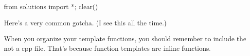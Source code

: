 \begin{python0}
from solutions import *; clear()
\end{python0}

Here's a very common gotcha. (I see this all the time.)

When you organize your template functions, you should remember to
include the  not a cpp file. That's because function templates are inline functions.



